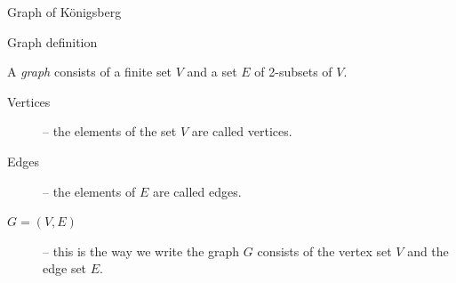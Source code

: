 \documentclass[dvipsnames, hidelinks]{beamer}
\begin{document}
  \begin{frame}{Graph of K{\"o}nigsberg}
    \begin{adjustbox}{max width={0.9\textwidth},center} 
    \end{adjustbox}
  \end{frame}
  
  \begin{frame}{Graph definition}
    \begin{definition}
    A \emph{graph} consists of a finite set $V$ and a set $E$ of 2-subsets of $V$.
    \end{definition}
    \vspace{0.5cm}
    \begin{description}
      \item[Vertices] -- the elements of the set $V$ are called vertices.
      \vspace{0.25cm}
      \item[Edges] -- the elements of $E$ are called edges.
      \vspace{0.25cm}
      \item[$G = (V,E)$] -- this is the way we write the graph $G$ consists of the vertex set $V$ and the edge set $E$.
    \end{description}
  \end{frame}
  
\end{document}
